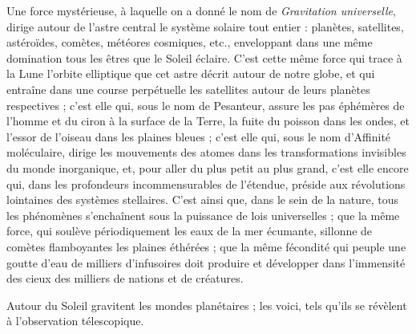 \documentclass[a4paper, 11pt, oneside, landscape]{article}
\begin{document}
Une force mystérieuse, à laquelle on a donné le nom de \emph{Gravitation universelle}, dirige autour de l'astre central le système solaire tout entier : planètes, satellites, astéroïdes, comètes, météores cosmiques, etc., enveloppant dans une même domination tous les êtres que le Soleil éclaire. C'est cette même force qui trace à la Lune l'orbite elliptique que cet astre décrit autour de notre globe, et qui entraîne dans une course perpétuelle les satellites autour de leurs planètes respectives ; c'est elle qui, sous le nom de Pesanteur, assure les pas éphémères de l'homme et du ciron à la surface de la Terre, la fuite du poisson dans les ondes, et l'essor de l'oiseau dans les plaines bleues ; c'est elle qui, sous le nom d'Affinité moléculaire, dirige les mouvements des atomes dans les transformations invisibles du monde inorganique, et, pour aller du plus petit au plus grand, c'est elle encore qui, dans les profondeurs incommensurables de l'étendue, préside aux révolutions lointaines des systèmes stellaires. C'est ainsi que, dans le sein de la nature, tous les phénomènes s'enchaînent sous la puissance de lois universelles ; que la même force, qui soulève périodiquement les eaux de la mer écumante, sillonne de comètes flamboyantes les plaines éthérées ; que la même fécondité qui peuple une goutte d'eau de milliers d'infusoires doit produire et développer dans l'immensité des cieux des milliers de nations et de créatures.

Autour du Soleil gravitent les mondes planétaires ; les voici, tels qu'ils se révèlent à l'observation télescopique.
\end{document}
